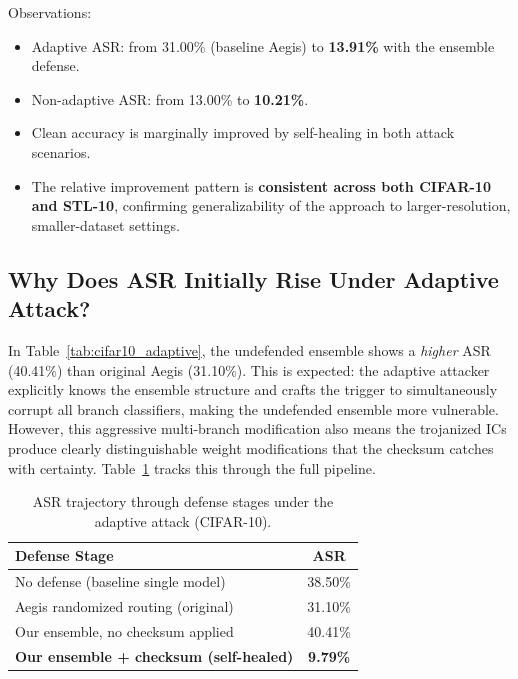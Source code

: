 \documentclass[12pt,a4paper]{article}
\newcommand{\asr}{\textsc{ASR}}
\begin{document}
Observations:
\begin{itemize}
    \item Adaptive \asr{}: from 31.00\% (baseline Aegis) to \textbf{13.91\%} with the ensemble defense.
    \item Non-adaptive \asr{}: from 13.00\% to \textbf{10.21\%}.
    \item Clean accuracy is marginally improved by self-healing in both attack scenarios.
    \item The relative improvement pattern is \textbf{consistent across both CIFAR-10 and STL-10}, confirming generalizability of the approach to larger-resolution, smaller-dataset settings.
\end{itemize}

\subsection{Why Does \asr{} Initially Rise Under Adaptive Attack?}

In Table~\ref{tab:cifar10_adaptive}, the undefended ensemble shows a \emph{higher} \asr{} (40.41\%) than original Aegis (31.10\%). This is expected: the adaptive attacker explicitly knows the ensemble structure and crafts the trigger to simultaneously corrupt all branch classifiers, making the undefended ensemble more vulnerable. However, this aggressive multi-branch modification also means the trojanized ICs produce clearly distinguishable weight modifications that the checksum catches with certainty. Table~\ref{tab:trajectory} tracks this through the full pipeline.

\begin{table}[H]
    \centering
    \caption{\asr{} trajectory through defense stages under the adaptive attack (CIFAR-10).}
    \label{tab:trajectory}
    \begin{tabular}{lc}
        \toprule
        \textbf{Defense Stage} & \textbf{\asr{}} \\
        \midrule
        No defense (baseline single model) & 38.50\% \\
        Aegis randomized routing (original) & 31.10\% \\
        Our ensemble, no checksum applied & 40.41\% \\
        \rowcolor{lightblue}
        \textbf{Our ensemble + checksum (self-healed)} & \textbf{9.79\%} \\
        \bottomrule
    \end{tabular}
\end{table}
\end{document}
